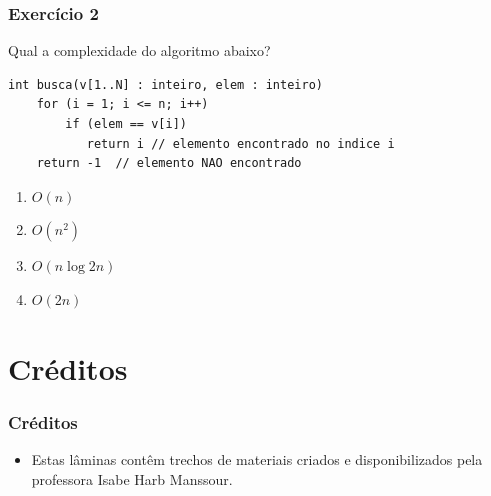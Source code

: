 \documentclass[aspectratio=169]{beamer}
\begin{document}
\begin{frame}[fragile]\frametitle{Exercício 2} %
Qual a complexidade do algoritmo abaixo?
{\scriptsize
\begin{verbatim}
int busca(v[1..N] : inteiro, elem : inteiro)
    for (i = 1; i <= n; i++)
        if (elem == v[i])
           return i // elemento encontrado no indice i
    return -1  // elemento NAO encontrado
\end{verbatim}
}
\begin{enumerate}[A]
	\item $O(n)$ %
	\item $O(n^2)$
	\item $O(n \log 2n)$
	\item $O(2n)$
\end{enumerate}
\end{frame}

\section{Créditos}

\begin{frame}\frametitle{Créditos}
\begin{itemize}
	\item Estas lâminas contêm trechos de materiais criados e disponibilizados pela professora Isabe Harb Manssour.
\end{itemize}
\end{frame}

\end{document}
